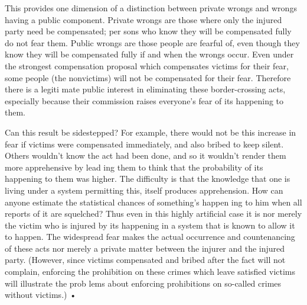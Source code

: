 \documentclass[11pt,openany]{book}
\begin{document}
This provides one dimension of a distinction between private wrongs and wrongs having a public component. Private wrongs are those where only the injured party need be compensated; per sons who know they will be compensated fully do not fear them. Public wrongs are those people are fearful of, even though they know they will be compensated fully if and when the wrongs occur. Even under the strongest compensation proposal which compensates victims for their fear, some people (the nonvictims) will not be compensated for their fear. Therefore there is a legiti mate public interest in eliminating these border-crossing acts, especially because their commission raises everyone's fear of its happening to them. 

Can this result be sidestepped? For example, there would not be this increase in fear if victims were compensated immediately, and also bribed to keep silent. Others wouldn't know the act had been done, and so it wouldn't render them more apprehensive by lead ing them to think that the probability of its happening to them was higher. The difficulty is that the knowledge that one is living under a system permitting this, itself produces apprehension. How can anyone estimate the statistical chances of something's happen ing to him when all reports of it are squelched? Thus even in this highly artificial case it is nor merely the victim who is injured by its happening in a system that is known to allow it to happen. The widespread fear makes the actual occurrence and countenancing of these acts nor merely a private matter between the injurer and the injured party. (However, since victims compensated and bribed after the fact will not complain, enforcing the prohibition on these crimes which leave satisfied victims will illustrate the prob lems about enforcing prohibitions on so-called crimes without victims.) • 
\end{document}
